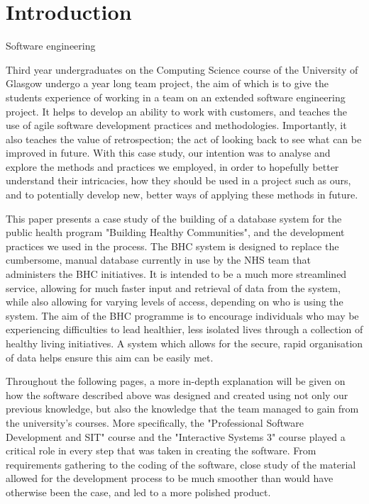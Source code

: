 \documentclass{l3proj}
\begin{document}
\educationalconsent


\section{Introduction}

Software engineering

Third year undergraduates on the Computing Science course of the University of Glasgow undergo a year long team project, the aim of which is to give the students experience of working in a team on an extended software engineering project. It helps to develop an ability to work with customers, and teaches the use of agile software development practices and methodologies. Importantly, it also teaches the value of retrospection; the act of looking back to see what can be improved in future. With this case study, our intention was to analyse and explore the methods and practices we employed, in order to hopefully better understand their intricacies, how they should be used in a project such as ours, and to potentially develop new, better ways of applying these methods in future.

This paper presents a case study of the building of a database system for the public health program "Building Healthy Communities", and the development practices we used in the process. The BHC system is designed to replace the cumbersome, manual database currently in use by the NHS team that administers the BHC initiatives. It is intended to be a much more streamlined service, allowing for much faster input and retrieval of data from the system, while also allowing for varying levels of access, depending on who is using the system. The aim of the BHC programme is to encourage individuals who may be experiencing difficulties to lead healthier, less isolated lives through a collection of healthy living initiatives. A system which allows for the secure, rapid organisation of data helps ensure this aim can be easily met.

Throughout the following pages, a more in-depth explanation will be given on how the software described above was designed and created using not only our previous knowledge, but also the knowledge that the team managed to gain from the university's courses. More specifically, the "Professional Software Development and SIT" course and the "Interactive Systems 3" course played a critical role in every step that was taken in creating the software. From requirements gathering to the coding of the software, close study of the material allowed for the development process to be much smoother than would have otherwise been the case, and led to a more polished product.
\end{document}
